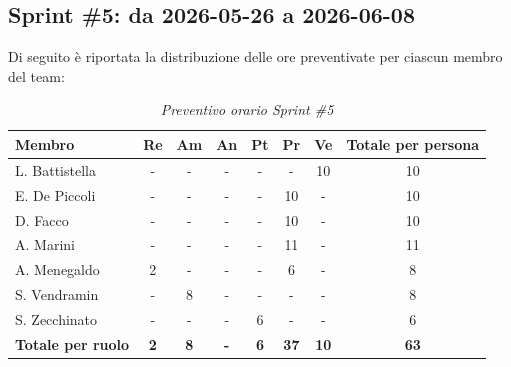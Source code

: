 \documentclass[a4paper, 10pt, colorlinks=true, linkcolor=black, urlcolor=blue, citecolor=blue, hidelinks]{article}
\renewcommand{\arraystretch}{1.2}
\begin{document}
\subsection{Sprint \#5: da 2026-05-26 a 2026-06-08}
Di seguito è riportata la distribuzione delle ore preventivate per ciascun membro del team:

\begin{table}[H]
    \centering
    \renewcommand{\arraystretch}{1.4}
    \begin{tabular}{|l|c|c|c|c|c|c|c|}
        \hline
        \rowcolor{bluBitless!15}
        \textbf{Membro} & \textbf{Re} & \textbf{Am} & \textbf{An} & \textbf{Pt} & \textbf{Pr} & \textbf{Ve} & \textbf{Totale per persona} \\
        \hline
        L. Battistella & - & - & - & - & - & 10 & 10 \\ \hline
        E. De Piccoli & - & - & - & - & 10 & - & 10 \\ \hline
        D. Facco & - & - & - & - & 10 & - & 10 \\ \hline
        A. Marini & - & - & - & - & 11 & - & 11 \\ \hline
        A. Menegaldo & 2 & - & - & - & 6 & - & 8 \\ \hline
        S. Vendramin & - & 8 & - & - & - & - & 8 \\ \hline
        S. Zecchinato & - & - & - & 6 & - & - & 6 \\ \hline
        \rowcolor{bluBitless!8}
        \textbf{Totale per ruolo} & \textbf{2} & \textbf{8} & \textbf{-} & \textbf{6} & \textbf{37} & \textbf{10} & \textbf{63} \\
        \hline
    \end{tabular}
    \caption{\textit{Preventivo orario Sprint \#5}}
\end{table}
\end{document}
